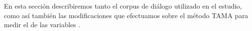 En esta sección describiremos tanto el corpus de diálogo utilizado en el estudio, como así también las modificaciones que efectuamos sobre el método TAMA para medir el \entrainment de las variables \ap.








